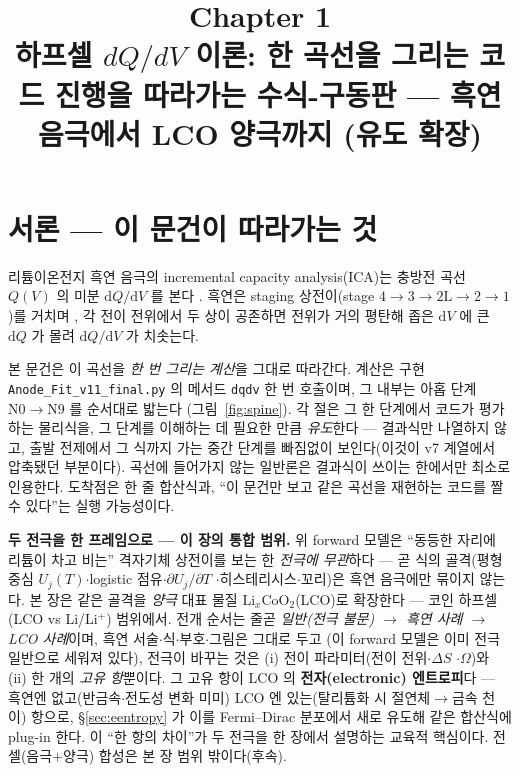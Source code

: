\documentclass[11pt,a4paper]{article}
\title{\textbf{\LARGE Chapter 1}\\[0.35em]\Large 하프셀 $dQ/dV$ 이론: 한 곡선을 그리는 코드 진행을 따라가는 수식-구동판 — 흑연 음극에서 LCO 양극까지 (유도 확장)}
\author{}
\date{}
\newcommand{\dd}{\mathrm{d}}
\newcommand{\code}[1]{\texttt{#1}}
\begin{document}
\maketitle

\section*{서론 — 이 문건이 따라가는 것}
리튬이온전지 흑연 음극의 incremental capacity analysis(ICA)는 충방전 곡선 $Q(V)$ 의 미분
$\dd Q/\dd V$ 를 본다 \cite{bloom2005,dubarry2012}. 흑연은 staging 상전이(stage
$4\!\to\!3\!\to\!2\mathrm L\!\to\!2\!\to\!1$)를 거치며 \cite{dahn1991,ohzuku1993}, 각 전이 전위에서
두 상이 공존하면 전위가 거의 평탄해 좁은 $\dd V$ 에 큰 $\dd Q$ 가 몰려 $\dd Q/\dd V$ 가 치솟는다.

본 문건은 이 곡선을 \emph{한 번 그리는 계산}을 그대로 따라간다. 계산은 구현 \code{Anode\_Fit\_v11\_final.py}
의 메서드 \code{dqdv} 한 번 호출이며, 그 내부는 아홉 단계 $\mathrm N0\!\to\!\mathrm N9$ 를 순서대로 밟는다
(그림~\ref{fig:spine}). 각 절은 그 한 단계에서 코드가 평가하는 물리식을, 그 단계를 이해하는 데 필요한 만큼
\emph{유도}한다 — 결과식만 나열하지 않고, 출발 전제에서 그 식까지 가는 중간 단계를 빠짐없이 보인다(이것이 v7
계열에서 압축됐던 부분이다). 곡선에 들어가지 않는 일반론은 결과식이 쓰이는 한에서만 최소로 인용한다. 도착점은 한 줄
합산식과, ``이 문건만 보고 같은 곡선을 재현하는 코드를 짤 수 있다''는 실행 가능성이다.

\textbf{두 전극을 한 프레임으로 — 이 장의 통합 범위.} 위 forward 모델은 ``동등한 자리에 리튬이 차고 비는'' 격자기체
상전이를 보는 한 \emph{전극에 무관}하다 — 곧 식의 골격(평형 중심 $U_j(T)$$\cdot$logistic 점유$\cdot$$\partial U_j/\partial T$
$\cdot$히스테리시스$\cdot$꼬리)은 흑연 음극에만 묶이지 않는다. 본 장은 같은 골격을 \emph{양극} 대표 물질
$\mathrm{Li}_x\mathrm{CoO_2}$(LCO)로 확장한다 — 코인 하프셀(LCO vs Li/Li$^+$) 범위에서. 전개 순서는 줄곧
\emph{일반(전극 불문) $\to$ 흑연 사례 $\to$ LCO 사례}이며, 흑연 서술$\cdot$식$\cdot$부호$\cdot$그림은 그대로 두고
(이 forward 모델은 이미 전극 일반으로 세워져 있다), 전극이 바꾸는 것은 (i) 전이 파라미터(전이 전위$\cdot$$\Delta S$
$\cdot$$\Omega$)와 (ii) 한 개의 \emph{고유 항}뿐이다. 그 고유 항이 LCO 의 \textbf{전자(electronic) 엔트로피}다 —
흑연엔 없고(반금속$\cdot$전도성 변화 미미) LCO 엔 있는(탈리튬화 시 절연체$\to$금속 천이) 항으로, \S\ref{sec:eentropy}
가 이를 Fermi--Dirac 분포에서 새로 유도해 같은 합산식에 plug-in 한다. 이 ``한 항의 차이''가 두 전극을 한 장에서
설명하는 교육적 핵심이다. 전셀(음극$+$양극) 합성은 본 장 범위 밖이다(후속).
\end{document}
